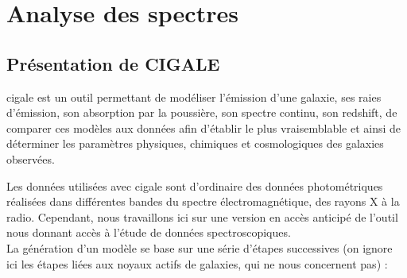 \documentclass[11pt, a4paper]{article}
\begin{document}
\section{Analyse des spectres}

\subsection{Présentation de CIGALE}

\gls{cigale} \parencite{cigale} est un outil permettant de modéliser l'émission d'une galaxie, ses raies d'émission, son absorption par la poussière, son spectre continu, son redshift, de comparer ces modèles aux données afin d'établir le plus vraisemblable et ainsi de déterminer les paramètres physiques, chimiques et cosmologiques des galaxies observées.

Les données utilisées avec \gls{cigale} sont d'ordinaire des données photométriques réalisées dans différentes bandes du spectre électromagnétique, des rayons X à la radio. Cependant, nous travaillons ici sur une version en accès anticipé de l'outil nous donnant accès à l'étude de données spectroscopiques.\\

La génération d'un modèle se base sur une série d'étapes successives (on ignore ici les étapes liées aux noyaux actifs de galaxies, qui ne nous concernent pas) :
\end{document}
